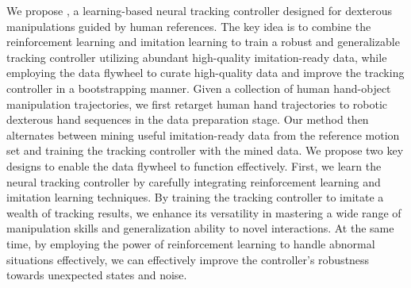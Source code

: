 We propose \modelnamenspace, a learning-based neural tracking controller designed for dexterous manipulations guided by human references. The key idea is to combine the reinforcement learning and imitation learning to train a robust and generalizable tracking controller  utilizing abundant high-quality imitation-ready data, while employing the data flywheel to curate high-quality data and improve the tracking controller in a bootstrapping manner. 
Given a collection of human hand-object manipulation trajectories, we first retarget human hand trajectories to robotic dexterous hand sequences in the data preparation stage. 
Our method then alternates between mining useful imitation-ready data from the reference motion set and training the tracking controller with the mined data. 
We propose two key designs to enable the data flywheel to function effectively. 
First, we learn the neural tracking controller by carefully integrating reinforcement learning and imitation learning techniques. 
By training the tracking controller to imitate a wealth of tracking results, we enhance its versatility in mastering a wide range of manipulation skills and generalization ability to novel interactions. At the same time, by employing the power of reinforcement learning to handle abnormal situations effectively, we can effectively improve the controller's robustness towards unexpected states and noise. 
